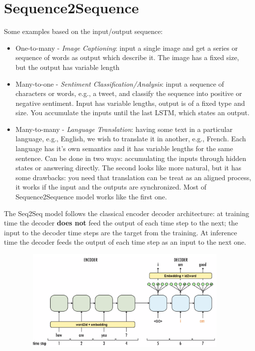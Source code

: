 \section{Sequence2Sequence}
Some examples based on the input/output sequence:
\begin{itemize}
    \item One-to-many  - \textit{Image Captioning}: input a single image and get a series or sequence of words as output which describe it. The image has a fixed size, but the output has variable length
    
    \item Many-to-one - \textit{Sentiment Classification/Analysis}: input a sequence of characters or words, e.g., a tweet, and classify the sequence into positive or negative sentiment. Input has variable lengths, output is of a fixed type and size. You accumulate the inputs until the last LSTM, which states an output. 
    \item Many-to-many - \textit{Language Translation}: having some text in a particular language, e.g., English, we wish to translate it in another, e.g., French. Each language has it’s own semantics and it has variable lengths for the same sentence. Can be done in two ways: accumulating the inputs through hidden states or answering directly. The second looks like more natural, but it has some drawbacks: you need that translation can be treat as an aligned process, it works if the input and the outputs are synchronized. Most of Sequence2Sequence model works like the first one.
\end{itemize}{}

The Seq2Seq model follows the classical encoder decoder architecture: at training time the decoder \textbf{does not} feed the output of each time step to the next; the input to the decoder time steps are the target from the training. At inference time the decoder feeds the output of each time step as an input to the next one.

\begin{minipage}{\linewidth}
        \centering
        \includegraphics[width=13cm, height=5cm]{images/s2s.png}
\end{minipage} \\

